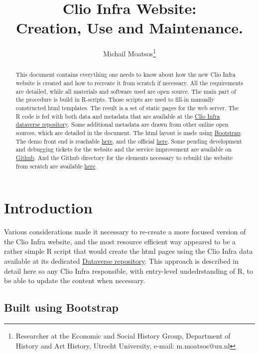 \documentclass[a4paper]{article}
\title{Clio Infra Website:\\ Creation, Use and Maintenance.}
\author{Michail Moatsos\footnote{Researcher at the Economic and Social History Group, Department of History and Art History, Utrecht University, e-mail: m.moatsos@uu.nl}}
\begin{document}
\maketitle 
\begin{abstract}
This document contains everything one needs to know about how the new Clio Infra website is created and how to recreate it from scratch if necessary. All the requirements are detailed, while all materials and software used are open source. The main part of the procedure is build in R-scripts. Those scripts are used to fill-in manually constructed html templates. The result is a set of static pages for the web server. The R code is fed with both data and metadata that are available at the \href{https://datasets.socialhistory.org/dataverse/clioinfra}{Clio Infra dataverse repository}. Some additional metadata are drawn from other online open sources, which are detailed in the document. The html layout is made using \href{http://getbootstrap.com/}{Bootstrap}. The demo front end is reachable \href{clio2.sandbox.socialhistoryservices.org}{here}, and the official \href{https://www.clio-infra.eu}{here}. Some pending development and debugging tickets for the website and the service improvement are available on \href{https://github.com/CLARIAH/wp4-requirements/issues?q=is:issue+is:open+label:clio-infra:website}{Github}. And the Github directory for the elements necessary to rebuild the website from scratch are available \href{https://github.com/CLARIAH/wp4-clioinfra}{here}.
\end{abstract}

\clearpage

\tableofcontents

\clearpage

\section{Introduction}\label{sec:intro}

Various considerations made it necessary to re-create a more focused version of 
the Clio Infra website, and the most resource efficient way appeared to be a 
rather simple R script that would create the html pages using the Clio Infra 
data available at its dedicated 
\href{https://datasets.socialhistory.org/dataverse/clioinfra}{Dataverse 
repository}. This approach is described in detail here so any Clio Infra 
responsible, with entry-level undedrstanding of R, to be able to update the 
content when necessary.

\subsection{Built using Bootstrap}
\end{document}
